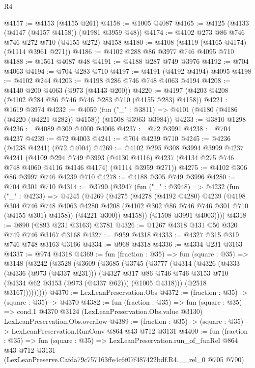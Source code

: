 \begin{lexlean}{R4}
\begin{coremodule}
@4157 := @4153 (@4155 @261)
@4158 := @1005 @4087
@4165 := @4125 (@4133 (@4147 (@4157 @4158)) (@1981 @3959 @48))
@4174 := @4102 @273 @86 @746 @746 @272 @710 (@4155 @272) @4158
@4180 := @4108 (@4119 (@4165 @4174) (@1114 @3961 @271))
@4186 := @4102 @288 @86 @3977 @746 @4095 @710
@4188 := @1561 @4087 @48
@4191 := @4188 @287 @749 @3976
@4192 := @704 @4063
@4194 := @704 @283 @710
@4197 := @4191 (@4192 @4194) @4095
@4198 := @4102 @244
@4203 := @4198 @286 @746 @748 @4063 @4194
@4208 := @4140 @200 @4063 (@973 (@4143 @200))
@4220 := @4197 (@4203 @4208 (@4102 @284 @86 @746 @746 @283 @710 (@4155 @283) @4158))
@4221 := @1619 @3974
@4232 := @4059
    (fun ("_" : @3811) => @4101 (@4180 (@4186 (@4220 (@4221 @282)) @4158)) (@1508 @3963 @3984))
@4233 := @3810 @1298
@4236 := @4089 @309 @4000 @4006
@4237 := @72 @3991
@4238 := @704 @4237
@4239 := @72 @4003
@4241 := @704 @4239 @710
@4245 := @4236 (@4238 @4241) (@72 @4004)
@4269 := @4102
    @295
    @308
    @3994
    @3999
    @4237
    @4241
    (@4109
      @294
      @749
      @3993
      (@4130 @4116)
      @4237
      (@4134 @275 @746 @748 @4060 @4116 @4146 @4174)
      (@1114 @3959 @271))
@4275 := @4102 @306 @86 @3997 @746 @4239 @710
@4278 := @4188 @305 @749 @3996
@4280 := @704 @301 @710
@4314 := @3790
    (@3947
      (fun ("_" : @3948) =>
      @4232
        (fun ("_" : @4233) =>
        @4245
          (@4269
            (@4275
              (@4278
                (@4192 @4280)
                @4239
                (@4198
                  @304
                  @746
                  @748
                  @4063
                  @4280
                  @4208
                  (@4102 @302 @86 @746 @746 @301 @710 (@4155 @301) @4158))
                (@4221 @300))
              @4158))
          (@1508 @3991 @4003))))
@4318 := @890 (@893 @231 @3163) @3781
@4326 := @1267 @4318 @131 @56 @320 @749 @746 @3167 @3168
@4327 := @959 @4318
@4333 := @4327 @315 @319 @746 @748 @3163 @3166
@4334 := @968 @4318
@4336 := @4334 @231 @3163
@4337 := @974 @4318
@4369 := fun (fraction : @35) =>
  fun (square : @35) =>
  @3148
    (@3242
      (@3528
        (@3609
          (@3685
            (@3745
              (@3777
                (@4314
                  (@4326
                    (@4333
                      (@4336 (@973 (@4337 @231)))
                      (@4327
                        @317
                        @86
                        @746
                        @746
                        @3153
                        @710
                        (@4334 @62 @3153 (@973 (@4337 @62)))
                        (@1005 @4318)))
                    (@2518 @3167)))))))))
@4370 := LexLeanPreservation.Obs
@4372 := (fraction : @35) -> (square : @35) -> @4370
@4382 := fun (fraction : @35) =>
  fun (square : @35) =>
  cond.{1} @4370 @3124 (LexLeanPreservation.Obs.value @3130) LexLeanPreservation.Obs.overflow
@4389 := (fraction : @35) -> (square : @35) -> LexLeanPreservation.RunConv @864 @43 @712 @3131
@4400 := fun (fraction : @35) =>
  fun (square : @35) =>
  LexLeanPreservation.run_of_funRel
    @864
    @43
    @712
    @3131
    (LexLeanPreserve.Cafda79c757163ffe4c6f07f487422bdf.R4.__rel_0 @705 @700)
\end{coremodule}
\end{lexlean}
